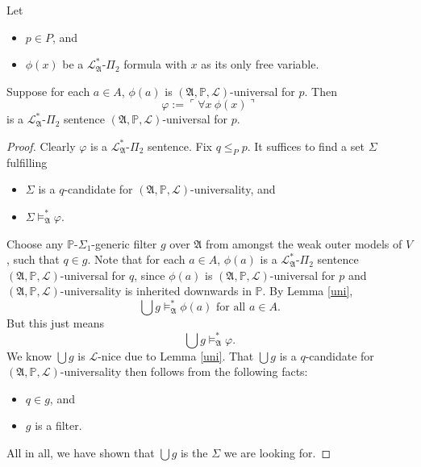 \documentclass[12pt]{article}
\numberwithin{equation}{section}
\begin{document}
\begin{lem}\label{univer}
Let 
\begin{itemize}
    \item $p \in P$, and
    \item $\phi(x)$ be a $\mathcal{L}^{*}_{\mathfrak{A}}$-$\Pi_2$ formula with $x$ as its only free variable. 
\end{itemize}
Suppose for each $a \in A$, $\phi(a)$ is $(\mathfrak{A}, \mathbb{P}, \mathcal{L})$-universal for $p$. Then
\begin{equation*}
    \varphi := \ulcorner \forall x \ \phi(x) \urcorner
\end{equation*}
is a $\mathcal{L}^{*}_{\mathfrak{A}}$-$\Pi_2$ sentence $(\mathfrak{A}, \mathbb{P}, \mathcal{L})$-universal for $p$.
\end{lem}
\begin{proof}
Clearly $\varphi$ is a $\mathcal{L}^{*}_{\mathfrak{A}}$-$\Pi_2$ sentence. Fix $q \leq_P p$. It suffices to find a set $\Sigma$ fulfilling
\begin{itemize}
    \item $\Sigma$ is a $q$-candidate for $(\mathfrak{A}, \mathbb{P}, \mathcal{L})$-universality, and 
    \item $\Sigma \models^{*}_{\mathfrak{A}} \varphi$.
\end{itemize}

Choose any $\mathbb{P}$-$\Sigma_1$-generic filter $g$ over $\mathfrak{A}$ from amongst the weak outer models of $V$, such that $q \in g$. Note that for each $a \in A$, $\phi(a)$ is a $\mathcal{L}^{*}_{\mathfrak{A}}$-$\Pi_2$ sentence $(\mathfrak{A}, \mathbb{P}, \mathcal{L})$-universal for $q$, since $\phi(a)$ is $(\mathfrak{A}, \mathbb{P}, \mathcal{L})$-universal for $p$ and $(\mathfrak{A}, \mathbb{P}, \mathcal{L})$-universality is inherited downwards in $\mathbb{P}$. By Lemma \ref{uni},
\begin{equation*}
    \bigcup g \models^{*}_{\mathfrak{A}} \phi(a) \text{ for all } a \in A \text{.}
\end{equation*}
But this just means 
\begin{equation*}
    \bigcup g \models^{*}_{\mathfrak{A}} \varphi \text{.}
\end{equation*}
We know $\bigcup g$ is $\mathcal{L}$-nice due to Lemma \ref{uni}. That $\bigcup g$ is a $q$-candidate for $(\mathfrak{A}, \mathbb{P}, \mathcal{L})$-universality then follows from the following facts:
\begin{itemize}
    \item $q \in g$, and
    \item $g$ is a filter.
\end{itemize}
All in all, we have shown that $\bigcup g$ is the $\Sigma$ we are looking for.
\end{proof}
\end{document}
